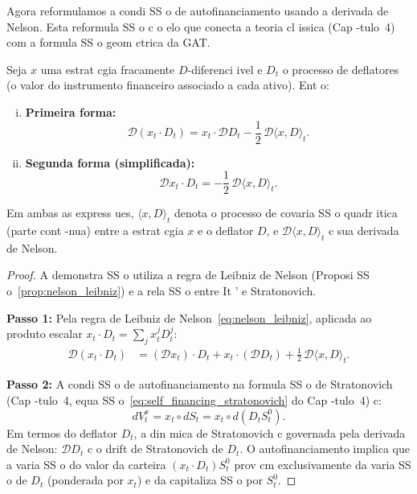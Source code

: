 {Agora reformulamos a condi SS o de autofinanciamento usando a derivada de
Nelson. Esta reformula SS o c o elo que conecta a teoria cl issica
(Cap -tulo~4) com a formula SS o geom ctrica da GAT.

\begin{teo}\label{teo:self_financing_D}
Seja $x$ uma estrat cgia fracamente $D$-diferenci ivel e $D_t$ o processo
de deflatores (o valor do instrumento financeiro associado a cada
ativo). Ent o:

\begin{enumerate}[(i)]
 \item \textbf{Primeira forma:}
 \begin{equation}\label{eq:sf_D_1}
 \mathcal{D}(x_t \cdot D_t)
 = x_t \cdot \mathcal{D}D_t - \frac{1}{2}\,
 \mathcal{D}\langle x, D\rangle_t.
 \end{equation}

 \item \textbf{Segunda forma (simplificada):}
 \begin{equation}\label{eq:sf_D_2}
 \mathcal{D}x_t \cdot D_t = -\frac{1}{2}\,
 \mathcal{D}\langle x, D\rangle_t.
 \end{equation}
\end{enumerate}
Em ambas as express ues, $\langle x, D\rangle_t$ denota o processo de
covaria SS o quadr itica (parte cont -nua) entre a estrat cgia $x$ e o
deflator $D$, e $\mathcal{D}\langle x, D\rangle_t$ c sua derivada de
Nelson.
\end{teo}

\begin{proof}
A demonstra SS o utiliza a regra de Leibniz de Nelson
(Proposi SS o~\ref{prop:nelson_leibniz}) e a rela SS o entre It ' e
Stratonovich.

\textbf{Passo 1:} Pela regra de Leibniz de
Nelson~\eqref{eq:nelson_leibniz}, aplicada ao produto escalar $x_t
\cdot D_t = \sum_j x_t^j D_t^j$:
\begin{align}
 \mathcal{D}(x_t \cdot D_t)
 &= (\mathcal{D}x_t) \cdot D_t + x_t \cdot (\mathcal{D}D_t)
 + \frac{1}{2}\,\mathcal{D}\langle x, D\rangle_t. \label{eq:pf1}
\end{align}

\textbf{Passo 2:} A condi SS o de autofinanciamento na formula SS o de
Stratonovich (Cap -tulo~4, equa SS o~\eqref{eq:self_financing_stratonovich} do
Cap -tulo~4) c:
\[
dV_t^x = x_t \circ dS_t = x_t \circ d(D_t S_t^0).
\]
Em termos do deflator $D_t$, a din mica de Stratonovich c governada
pela derivada de Nelson: $\mathcal{D}D_t$ c o drift de Stratonovich de
$D_t$. O autofinanciamento implica que a varia SS o do valor da carteira
$(x_t \cdot D_t)S_t^0$ prov cm exclusivamente da varia SS o de $D_t$
(ponderada por $x_t$) e da capitaliza SS o por $S_t^0$.


\end{proof}}
